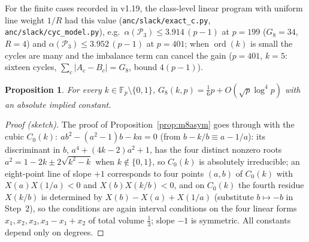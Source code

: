 \documentclass[11pt]{article}
\newtheorem{proposition}[theorem]{Proposition}
\theoremstyle{remark}
\newcommand{\Fp}{\mathbb{F}_p}
\newcommand{\Pset}{\mathcal{P}}
\begin{document}
For the finite cases recorded in v1.19, the class-level linear program with uniform line weight $1/R$ had this
value (\texttt{anc/slack/exact\_c.py}, \texttt{anc/slack/cyc\_model.py}), e.g.\ $\alpha(\Pset_3)\le3.914\,(p-1)$ at $p=199$
($G_8=34$, $R=4$) and $\alpha(\Pset_3)\le3.952\,(p-1)$ at $p=401$; when $\operatorname{ord}(k)$ is small the cycles are many and the
imbalance term can cancel the gain ($p=401$, $k=5$: sixteen cycles, $\sum_c|A_c-B_c|=G_8$, bound $4(p-1)$).

\begin{proposition}\label{prop:g8k}
For every $k\in\Fp\setminus\{0,1\}$, $G_8(k,p)=\tfrac16p+O(\sqrt p\log^4p)$ with an absolute implied constant.
\end{proposition}
\begin{proof}[Proof (sketch)]
The proof of Proposition~\ref{prop:m8asym} goes through with the cubic $C_0(k):\ ab^2-(a^2-1)b-ka=0$ (from $b-k/b\equiv a-1/a$): its
discriminant in $b$, $a^4+(4k-2)a^2+1$, has the four distinct nonzero roots $a^2=1-2k\pm2\sqrt{k^2-k}$ when $k\notin\{0,1\}$, so $C_0(k)$ is
absolutely irreducible; an eight-point line of slope $+1$ corresponds to four points $(a,b)$ of $C_0(k)$ with $X(a)X(1/a)<0$ and
$X(b)X(k/b)<0$, and on $C_0(k)$ the fourth residue $X(k/b)$ is determined by $X(b)-X(a)+X(1/a)$ (substitute $b\mapsto-b$ in Step~2), so the
conditions are again interval conditions on the four linear forms $x_1,x_2,x_3,x_3-x_1+x_2$ of total volume $\frac13$; slope $-1$ is
symmetric.  All constants depend only on degrees.
\end{proof}
\end{document}
